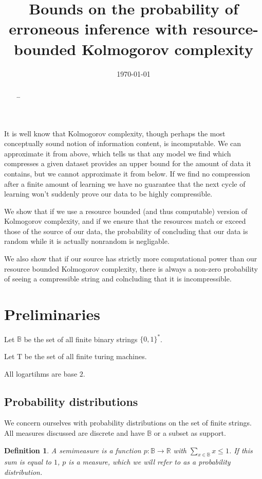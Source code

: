 \documentclass[10pt,a4paper,oneside]{article}
\title{Bounds on the probability of erroneous inference with resource-bounded Kolmogorov complexity}
\date{\today}
\newtheorem{dfn}{Definition}
\begin{document}
\maketitle

\begin{abstract}
\ldots
\end{abstract}

It is well know that Kolmogorov complexity, though perhaps the most conceptually sound notion of information content, is incomputable. We can approximate it from above, which tells us that any model we find which compresses a given dataset provides an upper bound for the amount of data it contains, but we cannot approximate it from below. If we find no compression after a finite amount of learning we have no guarantee that the next cycle of learning won't suddenly prove our data to be highly compressible. 

We show that if we use a resource bounded (and thus computable) version of Kolmogorov complexity, and if we ensure that the resources match or exceed those of the source of our data, the probability of concluding that our data is random while it is actually nonrandom is negligable.

We also show that if our source has strictly more computational power than our resource bounded Kolmogorov complexity, there is always a non-zero probability of seeing a compressible string and colncluding that it is incompressible. 

\section*{Preliminaries}
Let $\mathbb B$ be the set of all finite binary strings $\{0,1\}^*$.

Let {\cal T} be the set of all finite turing machines.

All logartihms are base $2$.

\subsection*{Probability distributions}

We concern ourselves with probability distributions on the set of finite strings. All measures discussed are discrete and have $\mathbb B$ or a subset as support.

\begin{dfn}
A \emph{semimeasure} is a function $p : {\mathbb B} \rightarrow {\mathbb R}$ with $\sum_{x \in \mathbb B} x \leq 1$. If this sum is equal to $1$, $p$ is a \emph{measure}, which we will refer to as a probability distribution.
\end{dfn}
\end{document}

